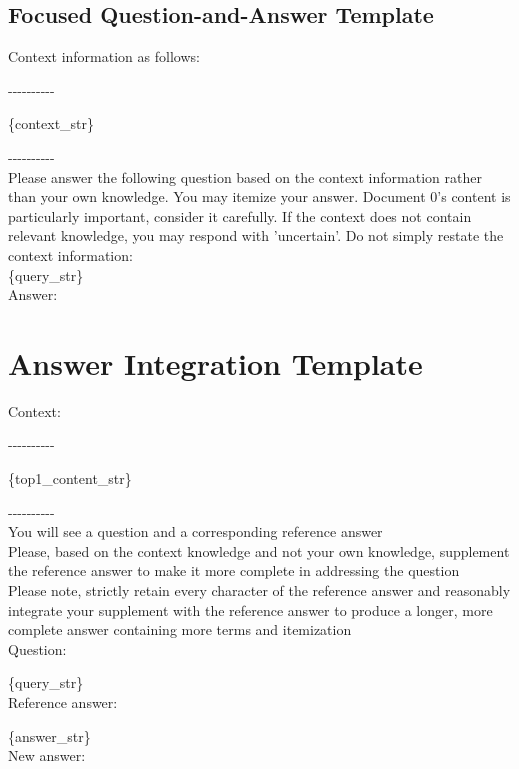 \documentclass[11pt]{article}
\begin{document}
\subsection{Focused Question-and-Answer Template}
\begin{tcolorbox}\label{sec:lean_temp}
Context information as follows:

-\--\--\--\--\--\--\--\--\--

\{{\color{blue}context\_str}\}

-\--\--\--\--\--\--\--\--\--\\

Please answer the following question based on the context information rather than your own knowledge. You may itemize your answer. Document 0's content is particularly important, consider it carefully. If the context does not contain relevant knowledge, you may respond with 'uncertain'. Do not simply restate the context information:\\

\{{\color{blue}query\_str}\}\\

Answer:
\end{tcolorbox}

\section{Answer Integration Template}

\begin{tcolorbox}\label{sec:merge_temp}
Context:

-\--\--\--\--\--\--\--\--\--

\{{\color{blue}top1\_content\_str}\}

-\--\--\--\--\--\--\--\--\--\\

You will see a question and a corresponding reference answer\\

Please, based on the context knowledge and not your own knowledge, supplement the reference answer to make it more complete in addressing the question\\

Please note, strictly retain every character of the reference answer and reasonably integrate your supplement with the reference answer to produce a longer, more complete answer containing more terms and itemization\\

Question:

\{{\color{blue}query\_str}\}\\

Reference answer:

\{{\color{blue}answer\_str}\}\\

New answer:

\end{tcolorbox}
\end{document}
